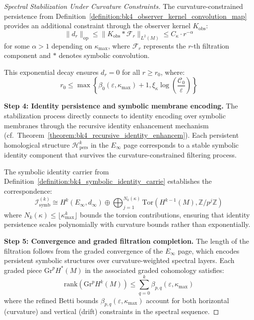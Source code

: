 \begin{proof}[Spectral Stabilization Under Curvature Constraints]
The curvature-constrained persistence from Definition~\ref{definition:bk4_observer_kernel_convolution_map} provides an additional constraint through the observer kernel $K_{\text{obs}}$:
\begin{equation}
\|d_r\|_{\text{op}} \leq \|K_{\text{obs}} * \mathcal{F}_r\|_{L^2(M)} \leq C_{\kappa} \cdot r^{-\alpha}
\end{equation}
for some $\alpha > 1$ depending on $\kappa_{\max}$, where $\mathcal{F}_r$ represents the $r$-th filtration component and $*$ denotes symbolic convolution.

This exponential decay ensures $d_r = 0$ for all $r \geq r_0$, where:
\begin{equation}
r_0 \leq \max\left\{\beta_0(\varepsilon, \kappa_{\max}) + 1, \xi_{\kappa} \log\left(\frac{\mathcal{C}_0}{\varepsilon}\right)\right\}
\end{equation}

\textbf{Step 4: Identity persistence and symbolic membrane encoding.}
The stabilization process directly connects to identity encoding over symbolic membranes through the recursive identity enhancement mechanism (cf.~Theorem~\ref{theorem:bk4_recursive_identity_enhancem}). Each persistent homological structure $\mathcal{H}_{\text{pers}}^k$ in the $E_\infty$ page corresponds to a stable symbolic identity component that survives the curvature-constrained filtering process.

The symbolic identity carrier from Definition~\ref{definition:bk4_symbolic_identity_carrie} establishes the correspondence:
\begin{equation}
\mathcal{I}_{\text{symb}}^{(k)} \cong H^k(E_\infty, d_\infty) \oplus \bigoplus_{j=1}^{N_k(\kappa)} \text{Tor}(H^{k-1}(M), \mathbb{Z}/p^j\mathbb{Z})
\end{equation}
where $N_k(\kappa) \leq \lfloor \kappa_{\max}^k \rfloor$ bounds the torsion contributions, ensuring that identity persistence scales polynomially with curvature bounds rather than exponentially.

\textbf{Step 5: Convergence and graded filtration completion.}
The length of the filtration follows from the graded convergence of the $E_\infty$ page, which encodes persistent symbolic structures over curvature-weighted spectral layers. Each graded piece $\text{Gr}^p H^*(M)$ in the associated graded cohomology satisfies:
\begin{equation}
\text{rank}(\text{Gr}^p H^k(M)) \leq \sum_{q=0}^k \beta_{p,q}(\varepsilon, \kappa_{\max})
\end{equation}
where the refined Betti bounds $\beta_{p,q}(\varepsilon, \kappa_{\max})$ account for both horizontal (curvature) and vertical (drift) constraints in the spectral sequence.


\end{proof}
